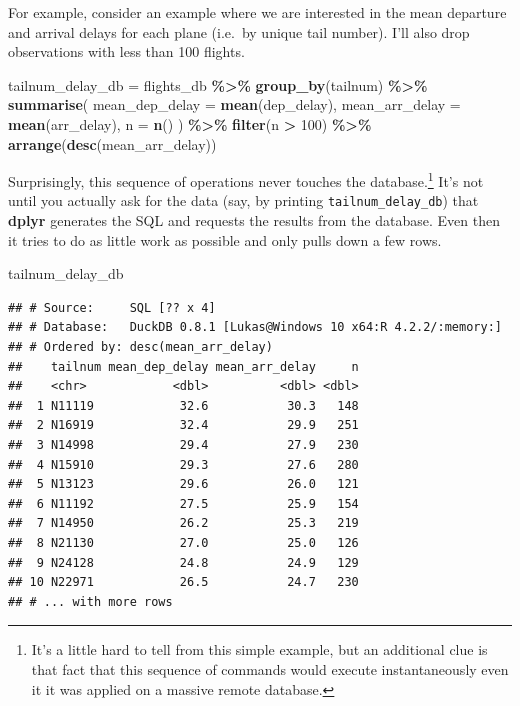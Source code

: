 \documentclass[
]{article}
\newenvironment{Shaded}{\begin{snugshade}}{\end{snugshade}}
\newcommand{\AttributeTok}[1]{\textcolor[rgb]{0.13,0.29,0.53}{#1}}
\newcommand{\DecValTok}[1]{\textcolor[rgb]{0.00,0.00,0.81}{#1}}
\newcommand{\FunctionTok}[1]{\textcolor[rgb]{0.13,0.29,0.53}{\textbf{#1}}}
\newcommand{\NormalTok}[1]{#1}
\newcommand{\OtherTok}[1]{\textcolor[rgb]{0.56,0.35,0.01}{#1}}
\newcommand{\SpecialCharTok}[1]{\textcolor[rgb]{0.81,0.36,0.00}{\textbf{#1}}}
\begin{document}
For example, consider an example where we are interested in the mean
departure and arrival delays for each plane (i.e.~by unique tail
number). I'll also drop observations with less than 100 flights.

\begin{Shaded}
\begin{Highlighting}[]
\NormalTok{tailnum\_delay\_db }\OtherTok{=} 
\NormalTok{  flights\_db }\SpecialCharTok{\%\textgreater{}\%} 
  \FunctionTok{group\_by}\NormalTok{(tailnum) }\SpecialCharTok{\%\textgreater{}\%}
  \FunctionTok{summarise}\NormalTok{(}
    \AttributeTok{mean\_dep\_delay =} \FunctionTok{mean}\NormalTok{(dep\_delay),}
    \AttributeTok{mean\_arr\_delay =} \FunctionTok{mean}\NormalTok{(arr\_delay),}
    \AttributeTok{n =} \FunctionTok{n}\NormalTok{()}
\NormalTok{    ) }\SpecialCharTok{\%\textgreater{}\%}
  \FunctionTok{filter}\NormalTok{(n }\SpecialCharTok{\textgreater{}} \DecValTok{100}\NormalTok{) }\SpecialCharTok{\%\textgreater{}\%} 
  \FunctionTok{arrange}\NormalTok{(}\FunctionTok{desc}\NormalTok{(mean\_arr\_delay))}
\end{Highlighting}
\end{Shaded}

Surprisingly, this sequence of operations never touches the
database.\footnote{It's a little hard to tell from this simple example,
  but an additional clue is that fact that this sequence of commands
  would execute instantaneously even it it was applied on a massive
  remote database.} It's not until you actually ask for the data (say,
by printing \texttt{tailnum\_delay\_db}) that \textbf{dplyr} generates
the SQL and requests the results from the database. Even then it tries
to do as little work as possible and only pulls down a few rows.

\begin{Shaded}
\begin{Highlighting}[]
\NormalTok{tailnum\_delay\_db}
\end{Highlighting}
\end{Shaded}

\begin{verbatim}
## # Source:     SQL [?? x 4]
## # Database:   DuckDB 0.8.1 [Lukas@Windows 10 x64:R 4.2.2/:memory:]
## # Ordered by: desc(mean_arr_delay)
##    tailnum mean_dep_delay mean_arr_delay     n
##    <chr>            <dbl>          <dbl> <dbl>
##  1 N11119            32.6           30.3   148
##  2 N16919            32.4           29.9   251
##  3 N14998            29.4           27.9   230
##  4 N15910            29.3           27.6   280
##  5 N13123            29.6           26.0   121
##  6 N11192            27.5           25.9   154
##  7 N14950            26.2           25.3   219
##  8 N21130            27.0           25.0   126
##  9 N24128            24.8           24.9   129
## 10 N22971            26.5           24.7   230
## # ... with more rows
\end{verbatim}
\end{document}
